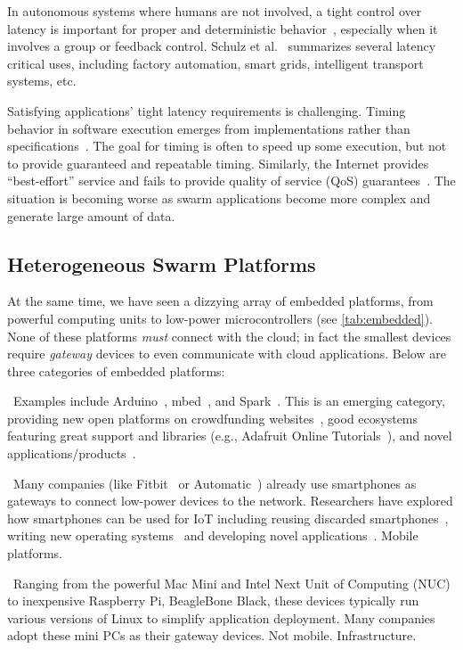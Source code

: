 In autonomous systems where humans are not involved, a tight control over
latency is important for proper and deterministic
behavior~\cite{eidson2012distributed}, especially when it involves a group or
feedback control. Schulz et al.~\cite{schulz2017latency} summarizes several
latency critical uses, including factory automation, smart grids, intelligent
transport systems, etc.

Satisfying applications' tight latency requirements is challenging. Timing
behavior in software execution emerges from implementations rather than
specifications~\cite{lee2018real}. The goal for timing is often to speed up some
execution, but not to provide guaranteed and repeatable timing. Similarly, the
Internet provides ``best-effort'' service and fails to provide quality of
service (QoS) guarantees~\cite{shenker1995fundamental}. The situation is
becoming worse as swarm applications become more complex and generate large
amount of data.

\subsection{Heterogeneous Swarm Platforms}
\label{sec:swarm-platforms}

At the same time, we have seen a dizzying array of embedded platforms, from
powerful computing units to low-power microcontrollers (see
\autoref{tab:embedded}). None of these platforms \emph{must} connect with the
cloud; in fact the smallest devices require \emph{gateway} devices to even
communicate with cloud applications. Below are three categories of embedded
platforms:

~Examples include Arduino~\cite{arduino},
mbed~\cite{mbed}, and Spark~\cite{spark}. This is an emerging category,
providing new open platforms on crowdfunding websites~\cite{kickstarter}, good
ecosystems featuring great support and libraries (e.g., Adafruit Online
Tutorials~\cite{adafruit}), and novel applications/products~\cite{iotlist}.

~Many companies (like Fitbit~\cite{fitbit} or
Automatic~\cite{automatic}) already use smartphones as gateways to connect
low-power devices to the network.  Researchers have explored how smartphones can
be used for IoT including reusing discarded smartphones~\cite{challen2014mote},
writing new operating systems~\cite{janos} and developing novel
applications~\cite{hong2014smartphone}. Mobile platforms.

~Ranging from the powerful Mac Mini and Intel Next Unit of
Computing (NUC) to inexpensive Raspberry Pi, BeagleBone Black, these devices
typically run various versions of Linux to simplify application deployment.
Many companies~\cite{ninja, smartthings, wink} adopt these mini PCs as their
gateway devices. Not mobile. Infrastructure.

